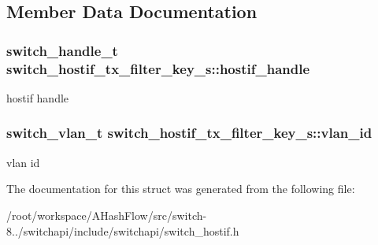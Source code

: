 \subsection{Member Data Documentation}
\hypertarget{structswitch__hostif__tx__filter__key__s_aa34efd8246c1d9429c52866591e2f02c}{
\subsubsection[{hostif\+\_\+handle}]{\setlength{\rightskip}{0pt plus 5cm}switch\+\_\+handle\+\_\+t switch\+\_\+hostif\+\_\+tx\+\_\+filter\+\_\+key\+\_\+s\+::hostif\+\_\+handle}}\label{structswitch__hostif__tx__filter__key__s_aa34efd8246c1d9429c52866591e2f02c}
hostif handle \hypertarget{structswitch__hostif__tx__filter__key__s_aecf8c776c606ae3aa8cd8ca509208c6e}{
\subsubsection[{vlan\+\_\+id}]{\setlength{\rightskip}{0pt plus 5cm}switch\+\_\+vlan\+\_\+t switch\+\_\+hostif\+\_\+tx\+\_\+filter\+\_\+key\+\_\+s\+::vlan\+\_\+id}}\label{structswitch__hostif__tx__filter__key__s_aecf8c776c606ae3aa8cd8ca509208c6e}
vlan id 

The documentation for this struct was generated from the following file\+:\begin{DoxyCompactItemize}
\item 
/root/workspace/\+A\+Hash\+Flow/src/switch-\/8../switchapi/include/switchapi/switch\+\_\+hostif.\+h\end{DoxyCompactItemize}
